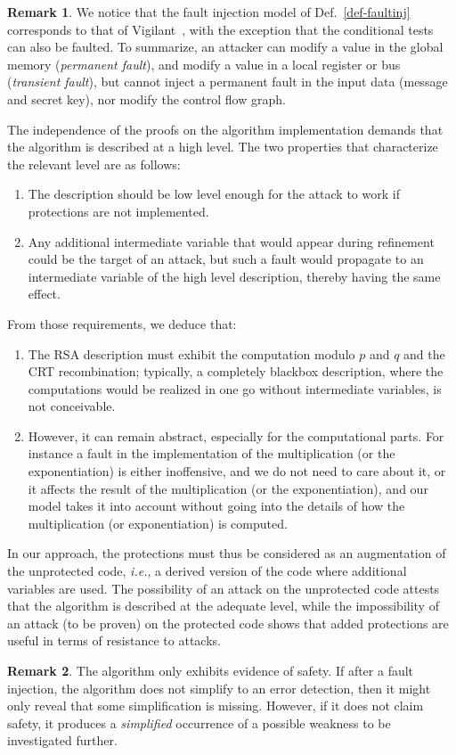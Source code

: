 \documentclass[10pt]{article}
\theoremstyle{definition}
\newtheorem{remark}{Remark}
\theoremstyle{theorem}
\newcommand{\ie}{\textit{i.e.}}
\begin{document}
\begin{remark}
We notice that the fault injection model of Def.~\ref{def-faultinj} corresponds to that of Vigilant~\cite{DBLP:conf/ches/Vigilant08}, with the exception that the conditional tests can also be faulted.
To summarize, an attacker can modify a value in the global memory (\emph{permanent fault}), and modify a value in a local register or bus (\emph{transient fault}),
but cannot inject a permanent fault in the input data (message and secret key), nor modify the control flow graph.
\end{remark}

The independence of the proofs on the algorithm implementation demands that the algorithm is described at a high level.
The two properties that characterize the relevant level are as follows:

\begin{enumerate}
\item The description should be low level enough for the attack to work if protections are not implemented.
\item Any additional intermediate variable that would appear during refinement could be the target of an attack,
but such a fault would propagate to an intermediate variable of the high level description, thereby having the same effect.
\end{enumerate}
From those requirements, we deduce that:
\begin{enumerate}
\item The RSA description must exhibit the computation modulo $p$ and $q$ and the CRT recombination;
typically, a completely blackbox description, where the computations would be realized in one go without intermediate variables, is not conceivable.
\item However, it can remain abstract, especially for the computational parts.
For instance a fault in the implementation of the multiplication (or the exponentiation) is either inoffensive, and we do not need to care about it, or it affects the result of the multiplication (or the exponentiation), and our model takes it into account without going into the details of how the multiplication (or exponentiation) is computed.
\end{enumerate}
In our approach, the protections must thus be considered as an augmentation of the unprotected code,
\ie, a derived version of the code where additional variables are used.
The possibility of an attack on the unprotected code attests that the algorithm is described at the adequate level,
while the impossibility of an attack (to be proven) on the protected code shows that added protections are useful in terms of resistance to attacks.
\begin{remark}
The algorithm only exhibits evidence of safety.
If after a fault injection, the algorithm does not simplify to an error detection, then it might only reveal that some simplification is missing.
However, if it does not claim safety, it produces a \emph{simplified} occurrence of a possible weakness to be investigated further.
\end{remark}
\end{document}
